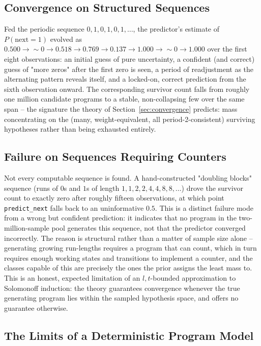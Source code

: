 \documentclass[11pt]{article}
\begin{document}
\subsection{Convergence on Structured Sequences}

Fed the periodic sequence $0,1,0,1,0,1,\ldots$, the predictor's estimate of
$P(\text{next}=1)$ evolved as $0.500 \to \sim\!0 \to 0.518 \to 0.769 \to 0.137 \to 1.000
\to \sim\!0 \to 1.000$ over the first eight observations: an initial guess of pure
uncertainty, a confident (and correct) guess of "more zeros" after the first zero is seen,
a period of readjustment as the alternating pattern reveals itself, and a locked-on,
correct prediction from the sixth observation onward. The corresponding survivor count
falls from roughly one million candidate programs to a stable, non-collapsing few over the
same span -- the signature the theory of Section~\ref{sec:convergence} predicts: mass
concentrating on the (many, weight-equivalent, all period-2-consistent) surviving
hypotheses rather than being exhausted entirely.

\subsection{Failure on Sequences Requiring Counters}

Not every computable sequence is found. A hand-constructed "doubling blocks" sequence
(runs of $0$s and $1$s of length $1,1,2,2,4,4,8,8,\ldots$) drove the survivor count to
exactly zero after roughly fifteen observations, at which point \texttt{predict\_next}
falls back to an uninformative $0.5$. This is a distinct failure mode from a wrong but
confident prediction: it indicates that no program in the two-million-sample pool
generates this sequence, not that the predictor converged incorrectly. The reason is
structural rather than a matter of sample size alone -- generating growing run-lengths
requires a program that can count, which in turn requires enough working states and
transitions to implement a counter, and the classes capable of this are precisely the
ones the prior assigns the least mass to. This is an honest, expected limitation of an
$l,t$-bounded approximation to Solomonoff induction: the theory guarantees convergence
whenever the true generating program lies within the sampled hypothesis space, and offers
no guarantee otherwise.

\subsection{The Limits of a Deterministic Program Model}
\end{document}
